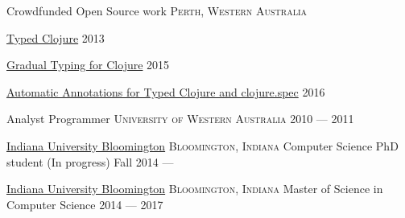 \documentclass[10pt,a4paper]{article}
\begin{document}
\headedsection
  {Crowdfunded Open Source work}
  {\textsc{Perth, Western Australia}} {%
  \headedsubsection
    {\href{https://www.indiegogo.com/projects/typed-clojure}{Typed Clojure}
  }
    {2013}
    {}

  \headedsubsection
  {\href{https://www.indiegogo.com/projects/gradual-typing-for-clojure}{Gradual Typing for Clojure}
  }
    {2015}
    {}

  \headedsubsection
  {\href{https://www.indiegogo.com/projects/typed-clojure-clojure-spec-auto-annotations}{Automatic
    Annotations for Typed Clojure and clojure.spec}
  }
    {2016}
    {}
}


\headedsection
  {Analyst Programmer}
  {\textsc{University of Western Australia}} {
  {2010 --- 2011}
  {
  }
}


\headedsection
  {\href{http://www.indiana.edu}{Indiana University Bloomington}}
  {\textsc{Bloomington, Indiana}} {%
  \headedsubsection
    {Computer Science PhD student (In progress)}
    {Fall 2014 ---}
    {}
}

\headedsection
  {\href{http://www.indiana.edu}{Indiana University Bloomington}}
  {\textsc{Bloomington, Indiana}} {%
  \headedsubsection
    {Master of Science in Computer Science}
    {2014 --- 2017}
    {}
}
\end{document}
